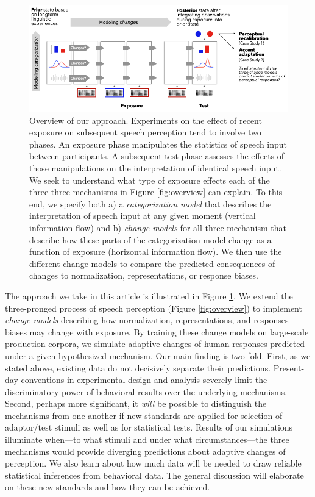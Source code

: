 \documentclass[
  11pt,
  english,
  man,floatsintext]{apa6}
\begin{document}
\begin{figure}[h]
\begin{center}
\includegraphics[width=.99\columnwidth]{../figures/diagrams/overview-of-changes.png}
\caption{Overview of our approach. Experiments on the effect of recent exposure on subsequent speech perception tend to involve two phases. An exposure phase manipulates the statistics of speech input between participants. A subsequent test phase assesses the effects of those manipulations on the interpretation of identical speech input. We seek to understand what type of exposure effects each of the three three mechanisms in Figure \ref{fig:overview} can explain. To this end, we specify both a) a {\em categorization model} that describes the interpretation of speech input at any given moment (vertical information flow) and b) {\em change models} for all three mechanism that describe how these parts of the categorization model change as a function of exposure (horizontal information flow). We then use the different change models to compare the predicted consequences of changes to normalization, representations, or response biases.}\label{fig:overview-change}
\end{center}
\end{figure}

The approach we take in this article is illustrated in Figure \ref{fig:overview-change}. We extend the three-pronged process of speech perception (Figure \ref{fig:overview}) to implement \emph{change models} describing how normalization, representations, and responses biases may change with exposure. By training these change models on large-scale production corpora, we simulate adaptive changes of human responses predicted under a given hypothesized mechanism. Our main finding is two fold. First, as we stated above, existing data do not decisively separate their predictions. Present-day conventions in experimental design and analysis severely limit the discriminatory power of behavioral results over the underlying mechanisms. Second, perhaps more significant, it \emph{will} be possible to distinguish the mechanisms from one another if new standards are applied for selection of adaptor/test stimuli as well as for statistical tests. Results of our simulations illuminate when---to what stimuli and under what circumstances---the three mechanisms would provide diverging predictions about adaptive changes of perception. We also learn about how much data will be needed to draw reliable statistical inferences from behavioral data. The general discussion will elaborate on these new standards and how they can be achieved.
\end{document}
